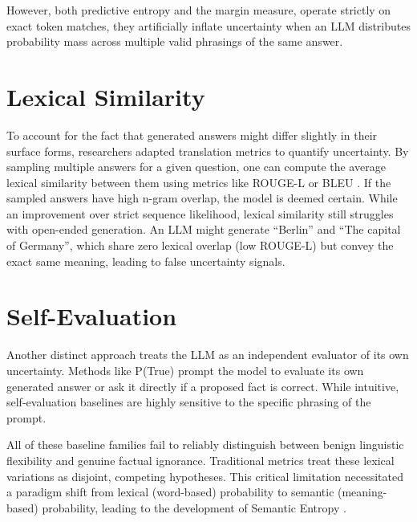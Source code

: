 However, both predictive entropy and the margin measure, operate
strictly on exact token matches, they artificially inflate uncertainty
when an LLM distributes probability mass across multiple valid 
phrasings of the same answer.


\section{Lexical Similarity}
\label{sec:related_work:lexical_similarity}
To account for the fact that generated answers might differ slightly
in their surface forms, researchers adapted translation metrics to
quantify uncertainty. By sampling multiple answers for a given
question, one can compute the average lexical similarity between
them using metrics like ROUGE-L \parencite{lin-2004-rouge} or BLEU
\parencite{BLEU}.
If the sampled answers have high n-gram overlap, the model is deemed
certain. While an improvement over strict sequence likelihood,
lexical similarity still struggles with open-ended generation.
An LLM might generate ``Berlin'' and ``The capital of Germany'', which
share zero lexical overlap (low ROUGE-L) but convey the exact same
meaning, leading to false uncertainty signals.

\section{Self-Evaluation}
\label{sec:related_work:self_evaluation}
Another distinct approach treats the LLM as an independent evaluator of
its own uncertainty. Methods like P(True)
\parencite{kadavath2022languagemodelsmostlyknow} prompt the model
to evaluate its own generated answer or ask it directly if a proposed
fact is correct.
While intuitive, self-evaluation baselines are highly sensitive
to the specific phrasing of the prompt.

All of these baseline families fail to reliably 
distinguish between benign linguistic flexibility and genuine factual 
ignorance. 
Traditional metrics treat these lexical variations as 
disjoint, competing hypotheses. 
This critical limitation necessitated a paradigm shift from lexical
(word-based) probability to semantic (meaning-based) probability, 
leading to the development of Semantic Entropy 
\parencite{kuhn2023semanticuncertaintylinguisticinvariances}.


